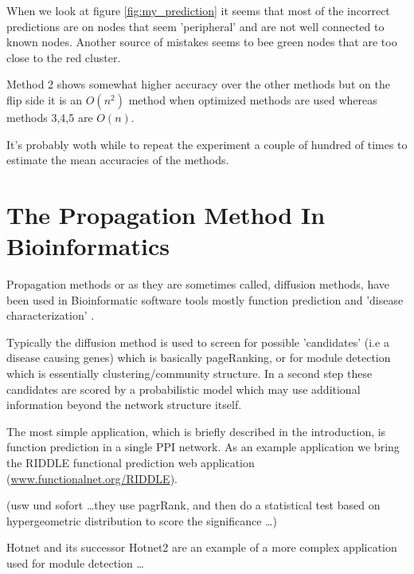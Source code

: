 \documentclass[a4paper,10pt]{article}
\theoremstyle{definition}
\theoremstyle{remark}
\theoremstyle{plain}
\begin{document}
When we look at figure \ref{fig:my_prediction} it seems that most of the
incorrect predictions are on nodes that seem 'peripheral' and  are not well
connected to known nodes. Another source of mistakes seems to bee green nodes
that are too close to the red cluster.

Method 2 shows somewhat higher accuracy over the other methods but on the flip
side it is an $O(n^2)$ method when optimized methods are used whereas methods
3,4,5 are $O(n)$.

It's probably woth while to repeat the experiment a couple of hundred of times
to estimate the mean accuracies of the methods.


\section{The Propagation Method In Bioinformatics}
%


Propagation methods or as they are sometimes called, diffusion methods, have
been used in Bioinformatic software tools mostly function prediction and
'disease characterization' \cite{cowen2017network}.

Typically the diffusion method is used to screen for possible 'candidates' (i.e
a disease causing genes) which is basically pageRanking, or for module detection
which is essentially clustering/community structure. In a second step these
candidates are scored by a probabilistic model which may use additional
information beyond the network structure itself.

The most simple application, which is briefly described in the introduction, is 
function prediction in a single PPI network. As an example application we bring
the RIDDLE \cite{wang2012riddle} functional prediction web application
(\url{www.functionalnet.org/RIDDLE}). 

(usw und sofort \dots they use pagrRank, and then do a statistical test based on
hypergeometric distribution to score the significance \dots) 




Hotnet \cite{vandin2012discovery} and its successor Hotnet2
\cite{leiserson2015pan} are an example of a more complex application
used for module detection \dots
\end{document}
